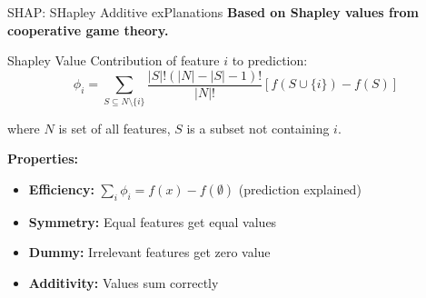 \documentclass[aspectratio=169]{beamer}
\begin{document}
\begin{frame}{SHAP: SHapley Additive exPlanations}
  \textbf{Based on Shapley values from cooperative game theory.}

  \vspace{0.5em}

  \begin{definitionbox}{Shapley Value}
    Contribution of feature $i$ to prediction:
    \begin{equation}
      \phi_i = \sum_{S \subseteq N \setminus \{i\}} \frac{|S|!(|N|-|S|-1)!}{|N|!} [f(S \cup \{i\}) - f(S)]
    \end{equation}

    where $N$ is set of all features, $S$ is a subset not containing $i$.
  \end{definitionbox}

  \vspace{0.5em}

  \textbf{Properties:}
  \begin{itemize}
    \item \textbf{Efficiency:} $\sum_i \phi_i = f(x) - f(\emptyset)$ (prediction explained)
    \item \textbf{Symmetry:} Equal features get equal values
    \item \textbf{Dummy:} Irrelevant features get zero value
    \item \textbf{Additivity:} Values sum correctly
  \end{itemize}
\end{frame}
\end{document}
